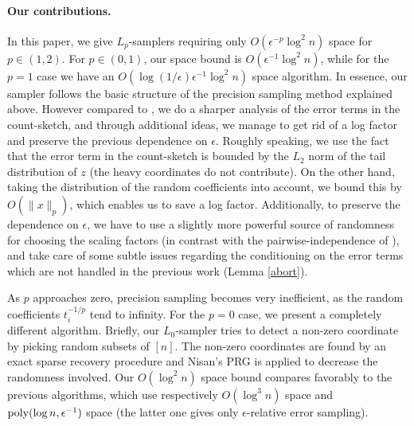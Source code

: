    \paragraph{Our contributions.} In %
   this paper,  we  give $L_p$-samplers requiring only
$O(\epsilon^{-p}\log^2n)$ space for $p \in (1,2)$. For $p \in (0,1)$,
our space bound is  $O(\epsilon^{-1}\log^2n)$, while for the $p=1$ case we have
an $O(\log(1/\epsilon)\epsilon^{-1}\log^2n)$ space algorithm.
    In essence, our sampler follows the basic structure of the
     precision sampling method explained above. %
      However compared to \cite{AndoniKO10}, we
      do a sharper analysis of the error terms in the count-sketch, and through
    additional ideas, we manage to get rid of a log factor
      and preserve the previous dependence on $\epsilon$. 
      Roughly speaking, we use the fact that 
      the error term in the count-sketch is bounded by the $L_2$ 
      norm of the tail distribution of $z$ (the heavy coordinates do not contribute). On
      the other hand, taking 
     the distribution of the random coefficients into account, we
     bound this by $O(\|x\|_p)$, which enables us to save a 
     log factor. Additionally, to preserve
      the dependence on $\epsilon$, we have to use a slightly more 
     powerful source of randomness for choosing the scaling factors
     (in contrast with the pairwise-independence of \cite{AndoniKO10}), and 
     take care of some subtle issues regarding the conditioning on
       the error terms which are not handled in the previous work 
       (Lemma \ref{abort}).
  
     
   As $p$ approaches zero, precision sampling becomes very inefficient, as
  the random coefficients $t_i^{-1/p}$ tend to infinity. For the $p=0$ case,
 we present a completely different algorithm. 
   Briefly, our $L_0$-sampler tries to 
   detect a non-zero
   coordinate by picking random subsets of $[n]$.
   The non-zero coordinates are found
   by an exact sparse recovery procedure and Nisan's PRG \cite{Nisan} 
   is applied to decrease the randomness involved.
   Our $O(\log^2 n)$ space bound compares favorably to the previous algorithms, which use respectively $O(\log^3 n)$ space \cite{FrahlingIS05} and $\operatorname{poly}(\log n,\epsilon^{-1})$  space \cite{MonemizadehW10} (the latter one gives only $\epsilon$-relative error sampling).

